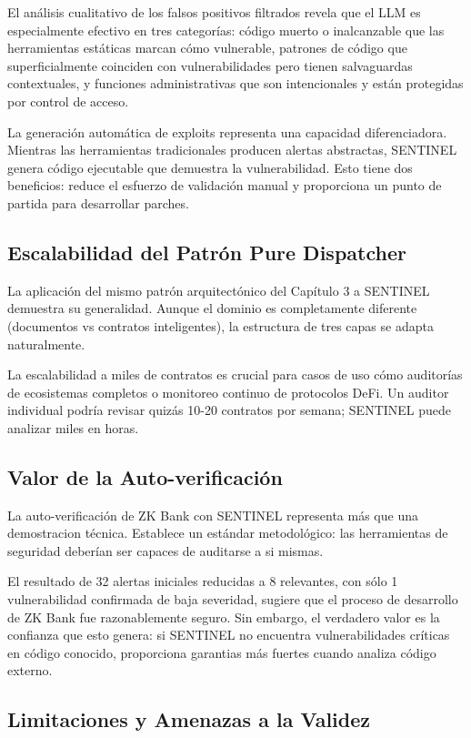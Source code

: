 \documentclass[12pt,a4paper,twoside]{book}
\begin{document}
El análisis cualitativo de los falsos positivos filtrados revela que el LLM es especialmente efectivo en tres categorías: código muerto o inalcanzable que las herramientas estáticas marcan cómo vulnerable, patrones de código que superficialmente coinciden con vulnerabilidades pero tienen salvaguardas contextuales, y funciones administrativas que son intencionales y están protegidas por control de acceso.

La generación automática de exploits representa una capacidad diferenciadora. Mientras las herramientas tradicionales producen alertas abstractas, SENTINEL genera código ejecutable que demuestra la vulnerabilidad. Esto tiene dos beneficios: reduce el esfuerzo de validación manual y proporciona un punto de partida para desarrollar parches.

\subsection{Escalabilidad del Patrón Pure Dispatcher}

La aplicación del mismo patrón arquitectónico del Capítulo 3 a SENTINEL demuestra su generalidad. Aunque el dominio es completamente diferente (documentos vs contratos inteligentes), la estructura de tres capas se adapta naturalmente.

La escalabilidad a miles de contratos es crucial para casos de uso cómo auditorías de ecosistemas completos o monitoreo continuo de protocolos DeFi. Un auditor individual podría revisar quizás 10-20 contratos por semana; SENTINEL puede analizar miles en horas.

\subsection{Valor de la Auto-verificación}

La auto-verificación de ZK Bank con SENTINEL representa más que una demostracion técnica. Establece un estándar metodológico: las herramientas de seguridad deberían ser capaces de auditarse a si mismas.

El resultado de 32 alertas iniciales reducidas a 8 relevantes, con sólo 1 vulnerabilidad confirmada de baja severidad, sugiere que el proceso de desarrollo de ZK Bank fue razonablemente seguro. Sin embargo, el verdadero valor es la confianza que esto genera: si SENTINEL no encuentra vulnerabilidades críticas en código conocido, proporciona garantias más fuertes cuando analiza código externo.

\subsection{Limitaciones y Amenazas a la Validez}
\end{document}
